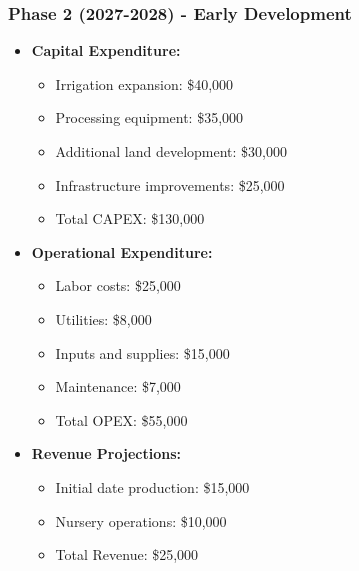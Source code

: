 \subsubsection{Phase 2 (2027-2028) - Early Development}
\begin{itemize}
    \item \textbf{Capital Expenditure:}
    \begin{itemize}
        \item Irrigation expansion: \$40,000
        \item Processing equipment: \$35,000
        \item Additional land development: \$30,000
        \item Infrastructure improvements: \$25,000
        \item Total CAPEX: \$130,000
    \end{itemize}
    \item \textbf{Operational Expenditure:}
    \begin{itemize}
        \item Labor costs: \$25,000
        \item Utilities: \$8,000
        \item Inputs and supplies: \$15,000
        \item Maintenance: \$7,000
        \item Total OPEX: \$55,000
    \end{itemize}
    \item \textbf{Revenue Projections:}
    \begin{itemize}
        \item Initial date production: \$15,000
        \item Nursery operations: \$10,000
        \item Total Revenue: \$25,000
    \end{itemize}
\end{itemize}

